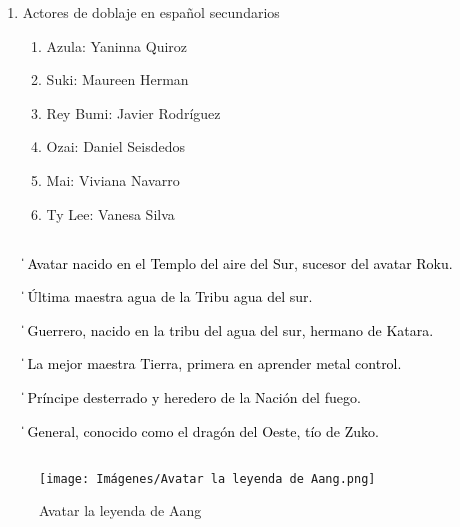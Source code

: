 \documentclass[a5paper,11pt]{article}
\begin{document}
{\begin{enumerate}
\begin{enumerate}
            \end{enumerate}
        \item Actores de doblaje en español secundarios
        \begin{enumerate}
            \item Azula: Yaninna Quiroz
            \item Suki: Maureen Herman
            \item Rey Bumi: Javier Rodríguez
            \item Ozai: Daniel Seisdedos
            \item Mai: Viviana Navarro
            \item Ty Lee: Vanesa Silva
        \end{enumerate}
    \end{enumerate}}
    \subsection*{\sf{\textit{\textcolor{SpringGreen}{Los actores de la isla Ember}}}}
    \textcolor{black}{\begin{itemize}
        \item [\|]  Avatar nacido en el Templo del aire del Sur, sucesor del avatar Roku.
        \item [\|]  Última maestra agua de la Tribu agua del sur.
        \item [\|]  Guerrero, nacido en la tribu del agua del sur, hermano de Katara.
        \item [\|]  La mejor maestra Tierra, primera en aprender metal control.
         \item [\|]  Príncipe desterrado y heredero de la Nación del fuego.
          \item [\|]  General, conocido como el dragón del Oeste, tío de Zuko.
    \end{itemize}}
    
    \subsection*{\sf{\textit{\textcolor{SpringGreen}{Se busca}}}}

    \begin{figure}[h]
        \begin{flushright}
        \caption*{Avatar la leyenda de Aang}
        \texttt{[image: Imágenes/Avatar la leyenda de Aang.png]}
        \end{flushright}
    \end{figure}
\end{document}
